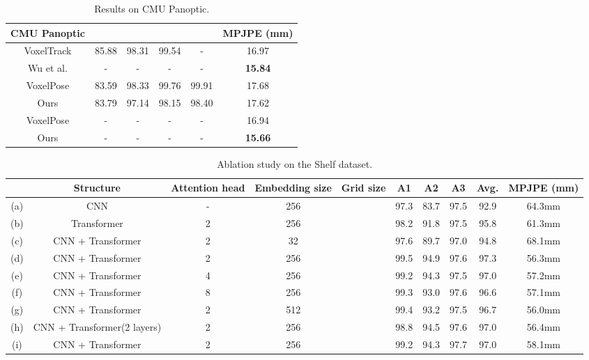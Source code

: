 \documentclass[lettersize,journal]{IEEEtran}
\begin{document}
\begin{table}[ht]
\centering
\caption{Results on CMU Panoptic.}
\resizebox{\linewidth}{!} {
\begin{tabular}{cccccc}
\hline
CMU Panoptic &  &  &  &  & MPJPE (mm) \\
\hline
VoxelTrack \cite{zhang2021voxeltrack} & 85.88 & 98.31 & 99.54 & - &  16.97\\
\hline
Wu et al. \cite{wu2021graph} & - & - & - & - & \textbf{15.84} \\
VoxelPose \cite{tu2020voxelpose} & 83.59 & 98.33 & 99.76 & 99.91 & 17.68\\
Ours & 83.79 & 97.14 & 98.15 & 98.40 &  17.62 \\
\hline
 VoxelPose \cite{tu2020voxelpose} & - & - & - & - & 16.94\\
 Ours & - & - & - & - & \textbf{15.66} \\
\hline
\end{tabular}
}
\label{tab:tab_CMU}
\end{table}



\begin{table*}[!h]
\centering
\caption{Ablation study on the Shelf dataset.}
\begin{tabular}{cccccccccc}
\hline
& Structure & Attention head & Embedding size & Grid size & A1 & A2 & A3 & Avg. & MPJPE (mm)\\
\hline
(a) & CNN  & - & 256 &  & 97.3 & 83.7 & 97.5 & 92.9 & 64.3mm\\

(b) &  Transformer  & 2 & 256 &  & 98.2 & 91.8 & 97.5 & 95.8 & 61.3mm\\


(c) &  CNN + Transformer  & 2 & 32 &  & 97.6 & 89.7 & 97.0 & 94.8 & 68.1mm\\





(d) &  CNN + Transformer & 2 & 256 &  & 99.5 & 94.9 & 97.6 & 97.3 & 56.3mm\\

(e) &  CNN + Transformer & 4 & 256 &  & 99.2 & 94.3 & 97.5 & 97.0 & 57.2mm\\

(f) &  CNN + Transformer & 8 & 256 &  & 99.3 & 93.0 & 97.6 & 96.6 & 57.1mm\\

(g) &  CNN + Transformer & 2 & 512 &  & 99.4 & 93.2 & 97.5 & 96.7 & 56.0mm\\

(h) &  CNN + Transformer(2 layers) & 2 & 256 &  & 98.8 & 94.5 & 97.6 & 97.0 & 56.4mm\\

(i) &  CNN + Transformer & 2 & 256 &  & 99.2 & 94.3 & 97.7 & 97.0 & 58.1mm\\
\hline
\end{tabular}
\label{tab:ablation}
\end{table*}
\end{document}
